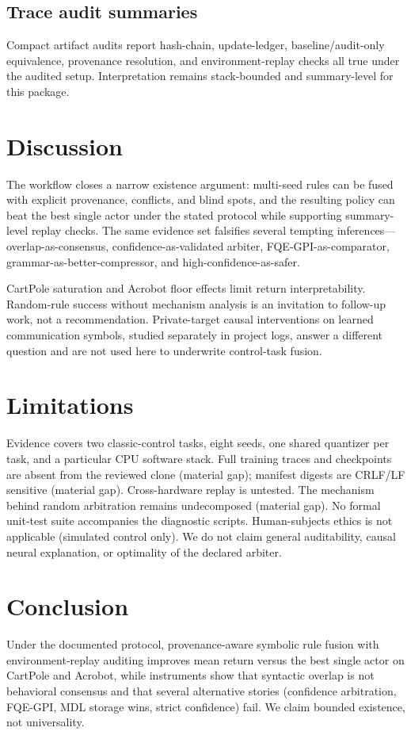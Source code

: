 \documentclass[11pt,a4paper]{article}
\begin{document}
\subsection{Trace audit summaries}
\label{sec:audit-results}

Compact artifact audits report hash-chain, update-ledger, baseline/audit-only equivalence, provenance resolution, and environment-replay checks all true under the audited setup.
Interpretation remains stack-bounded and summary-level for this package.

\section{Discussion}
\label{sec:discussion}

The workflow closes a narrow existence argument: multi-seed rules can be fused with explicit provenance, conflicts, and blind spots, and the resulting policy can beat the best single actor under the stated protocol while supporting summary-level replay checks.
The same evidence set falsifies several tempting inferences---overlap-as-consensus, confidence-as-validated arbiter, FQE-GPI-as-comparator, grammar-as-better-compressor, and high-confidence-as-safer.

CartPole saturation and Acrobot floor effects limit return interpretability.
Random-rule success without mechanism analysis is an invitation to follow-up work, not a recommendation.
Private-target causal interventions on learned communication symbols, studied separately in project logs, answer a different question and are not used here to underwrite control-task fusion.

\section{Limitations}
\label{sec:limitations}

Evidence covers two classic-control tasks, eight seeds, one shared quantizer per task, and a particular CPU software stack.
Full training traces and checkpoints are absent from the reviewed clone (material gap); manifest digests are CRLF/LF sensitive (material gap).
Cross-hardware replay is untested. The mechanism behind random arbitration remains undecomposed (material gap).
No formal unit-test suite accompanies the diagnostic scripts.
Human-subjects ethics is not applicable (simulated control only).
We do not claim general auditability, causal neural explanation, or optimality of the declared arbiter.

\section{Conclusion}
\label{sec:conclusion}

Under the documented protocol, provenance-aware symbolic rule fusion with environment-replay auditing improves mean return versus the best single actor on CartPole and Acrobot, while instruments show that syntactic overlap is not behavioral consensus and that several alternative stories (confidence arbitration, FQE-GPI, MDL storage wins, strict confidence) fail.
We claim bounded existence, not universality.



\end{document}
